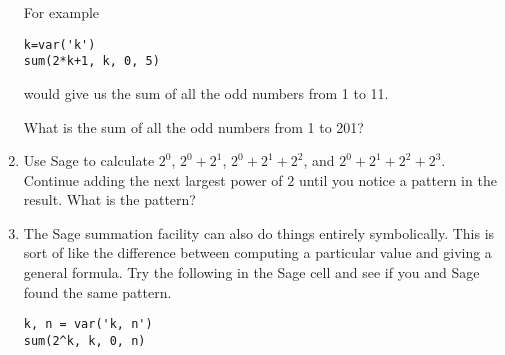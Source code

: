 \begin{enumerate}
	For example

\begin{codeblock}
\begin{verbatim}
k=var('k')
sum(2*k+1, k, 0, 5)
\end{verbatim}
\end{codeblock}

\noindent would give us the sum of all the odd numbers from 1 to 11.

What is the sum of all the odd numbers from 1 to 201?

\item Use Sage to calculate $2^0$, $2^0+2^1$, $2^0+2^1+2^2$, 
		and $2^0+2^1+2^2+2^3$. Continue adding the next
		largest power of $2$ until you notice a pattern in the
		result. What is the pattern?

\item The Sage summation facility can also do things entirely symbolically.  This is sort of like the difference between computing a particular value and giving a general formula.  Try the following in the Sage cell and see if you and Sage found the same pattern.

\begin{codeblock}
\begin{verbatim}
k, n = var('k, n')
sum(2^k, k, 0, n)
\end{verbatim}
\end{codeblock}


\end{enumerate}

